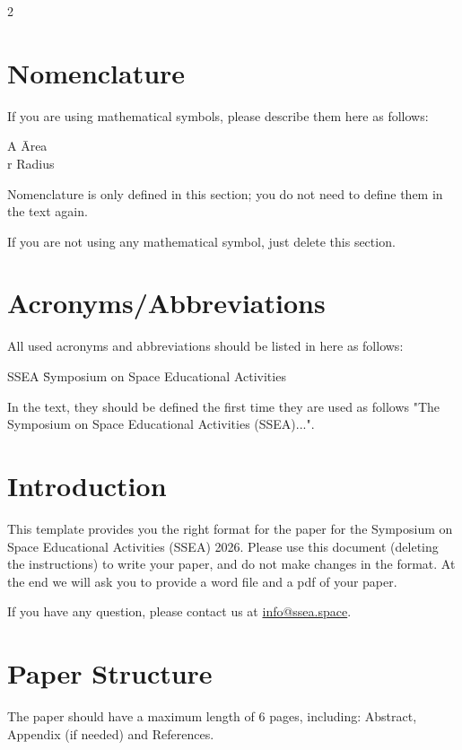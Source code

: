 \documentclass[10pt]{article}
\begin{document}
\begin{multicols}{2}

\section*{Nomenclature}
If you are using mathematical symbols, please describe them here as follows:

\begin{tabbing}
A \hspace{2cm} \= Area \\
r \> Radius \\
\end{tabbing}

Nomenclature is only defined in this section; you do not need to define them in the text again.

If you are not using any mathematical symbol, just delete this section.

\section*{Acronyms/Abbreviations}
All used acronyms and abbreviations should be listed in here as follows:

\begin{tabbing}
SSEA \= Symposium on Space Educational Activities \\
\end{tabbing}

In the text, they should be defined the first time they are used as follows "The Symposium on Space Educational Activities (SSEA)...".

\section{Introduction}
This template provides you the right format for the paper for the Symposium on Space Educational Activities (SSEA) 2026. Please use this document (deleting the instructions) to write your paper, and do not make changes in the format. At the end we will ask you to provide a word file and a pdf of your paper.

If you have any question, please contact us at \href{mailto:info@ssea.space}{info@ssea.space}.

\section{Paper Structure}
The paper should have a maximum length of 6 pages, including: Abstract, Appendix (if needed) and References.


\end{multicols}
\end{document}
